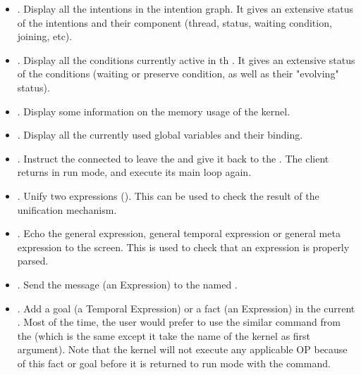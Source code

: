 \begin{itemize}

\item {}. Display all the intentions in the intention graph.
It gives an extensive status of the intentions and their component (thread,
status, waiting condition, joining, etc).

\item {}. Display all the conditions currently active in th
\CPK{}. It gives an extensive status of the conditions (waiting or preserve
condition, as well as their "evolving" status).

\item {}. Display some information on the memory usage of the
kernel. 

\item {}. Display all the currently used global variables and
their binding.

\item {}. Instruct the connected \COPRS{} to leave the
 and give it back to the \OPRSS{}. The \COPRS{} client returns
in run mode, and execute its main loop again.

\item {}. Unify two expressions
(). This can be used to check the result of the
unification mechanism.

\item {}. Echo the general
expression, general temporal expression or general meta expression to the
screen. This is used to check that an expression is properly parsed.

\item {}. Send the message (an Expression) to the
\COPRS{} named .

\item {}. Add a goal (a Temporal Expression) or a fact
(an Expression) in the current \CPK{}. Most of the time, the user
would prefer to use the similar command from the \OPRSS{} (which is the
same except it take the name of the kernel as first argument). Note that
the kernel will not execute any applicable OP because of this fact or
goal before it is returned to run mode with the  command.


\end{itemize}
